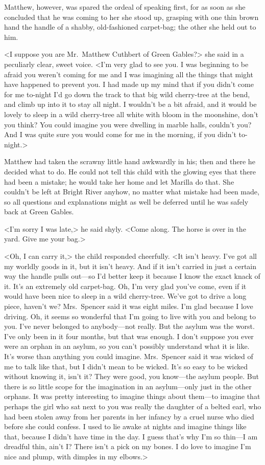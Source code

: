 Matthew, however, was spared the ordeal of speaking first, for as soon as she concluded that he was coming to her she stood up, grasping with one thin brown hand the handle of a shabby, old-fashioned carpet-bag; the other she held out to him.

<I suppose you are Mr.~Matthew Cuthbert of Green Gables?> she said in a peculiarly clear, sweet voice. <I'm very glad to see you. I was beginning to be afraid you weren't coming for me and I was imagining all the things that might have happened to prevent you. I had made up my mind that if you didn't come for me to-night I'd go down the track to that big wild cherry-tree at the bend, and climb up into it to stay all night. I wouldn't be a bit afraid, and it would be lovely to sleep in a wild cherry-tree all white with bloom in the moonshine, don't you think? You could imagine you were dwelling in marble halls, couldn't you? And I was quite sure you would come for me in the morning, if you didn't to-night.>

Matthew had taken the scrawny little hand awkwardly in his; then and there he decided what to do. He could not tell this child with the glowing eyes that there had been a mistake; he would take her home and let Marilla do that. She couldn't be left at Bright River anyhow, no matter what mistake had been made, so all questions and explanations might as well be deferred until he was safely back at Green Gables.

<I'm sorry I was late,> he said shyly. <Come along. The horse is over in the yard. Give me your bag.>

<Oh, I can carry it,> the child responded cheerfully. <It isn't heavy. I've got all my worldly goods in it, but it isn't heavy. And if it isn't carried in just a certain way the handle pulls out—so I'd better keep it because I know the exact knack of it. It's an extremely old carpet-bag. Oh, I'm very glad you've come, even if it would have been nice to sleep in a wild cherry-tree. We've got to drive a long piece, haven't we? Mrs.~Spencer said it was eight miles. I'm glad because I love driving. Oh, it seems so wonderful that I'm going to live with you and belong to you. I've never belonged to anybody—not really. But the asylum was the worst. I've only been in it four months, but that was enough. I don't suppose you ever were an orphan in an asylum, so you can't possibly understand what it is like. It's worse than anything you could imagine. Mrs.~Spencer said it was wicked of me to talk like that, but I didn't mean to be wicked. It's so easy to be wicked without knowing it, isn't it? They were good, you know—the asylum people. But there is so little scope for the imagination in an asylum—only just in the other orphans. It was pretty interesting to imagine things about them—to imagine that perhaps the girl who sat next to you was really the daughter of a belted earl, who had been stolen away from her parents in her infancy by a cruel nurse who died before she could confess. I used to lie awake at nights and imagine things like that, because I didn't have time in the day. I guess that's why I'm so thin—I am dreadful thin, ain't I\@? There isn't a pick on my bones. I do love to imagine I'm nice and plump, with dimples in my elbows.>

